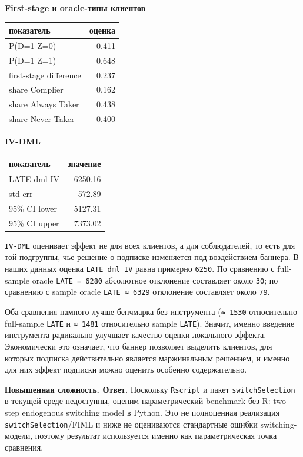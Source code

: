 \documentclass[11pt]{article}
\newcounter{none}
\begin{document}
    \textbf{First-stage и oracle-типы клиентов}

{\def\LTcaptype{none} %
\begin{longtable}[]{@{}lr@{}}
\toprule\noalign{}
показатель & оценка \\
\midrule\noalign{}
\endhead
\bottomrule\noalign{}
\endlastfoot
P(D=1 \textbar{} Z=0) & 0.411 \\
P(D=1 \textbar{} Z=1) & 0.648 \\
first-stage difference & 0.237 \\
share Complier & 0.162 \\
share Always Taker & 0.438 \\
share Never Taker & 0.400 \\
\end{longtable}
}

    \textbf{IV-DML}

{\def\LTcaptype{none} %
\begin{longtable}[]{@{}lr@{}}
\toprule\noalign{}
показатель & значение \\
\midrule\noalign{}
\endhead
\bottomrule\noalign{}
\endlastfoot
LATE dml IV & 6250.16 \\
std err & 572.89 \\
95\% CI lower & 5127.31 \\
95\% CI upper & 7373.02 \\
\end{longtable}
}

    \texttt{IV-DML} оценивает эффект не для всех клиентов, а для
соблюдателей, то есть для той подгруппы, чье решение о подписке
изменяется под воздействием баннера. В наших данных оценка
\texttt{LATE\ dml\ IV} равна примерно \texttt{6250}. По сравнению с
full-sample oracle \texttt{LATE\ =\ 6280} абсолютное отклонение
составляет около \texttt{30}; по сравнению с sample oracle
\texttt{LATE\ ≈\ 6329} отклонение составляет около \texttt{79}.

Оба сравнения намного лучше бенчмарка без инструмента (\texttt{≈\ 1530}
относительно full-sample \texttt{LATE} и \texttt{≈\ 1481} относительно
sample \texttt{LATE}). Значит, именно введение инструмента радикально
улучшает качество оценки локального эффекта. Экономически это означает,
что баннер позволяет выделить клиентов, для которых подписка
действительно является маржинальным решением, и именно для них эффект
подписки можно оценить особенно содержательно.

    \textbf{Повышенная сложность. Ответ.} Поскольку \texttt{Rscript} и пакет
\texttt{switchSelection} в текущей среде недоступны, оценим
параметрический benchmark без R: two-step endogenous switching model в
Python. Это не полноценная реализация \texttt{switchSelection}/FIML и
ниже не оцениваются стандартные ошибки switching-модели, поэтому
результат используется именно как параметрическая точка сравнения.
\end{document}
